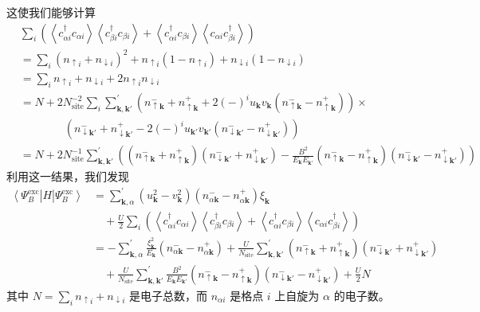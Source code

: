 这使我们能够计算
\begin{align*}
&\sum_{i}\left(\left\langle c^{\dagger}_{\alpha i}c_{\alpha i}\right\rangle \left\langle c^{\dagger}_{\beta i}c_{\beta i}\right\rangle + \left\langle c^{\dagger}_{\alpha i}c_{\beta i}\right\rangle \left\langle c_{\alpha i}c^{\dagger}_{\beta i}\right\rangle\right)\\
&=\sum_{i}\left(n_{\uparrow i}+n_{\downarrow i}\right)^{2}+n_{\uparrow i}\left(1-n_{\uparrow i}\right)+n_{\downarrow i}\left(1-n_{\downarrow i}\right)\\
&=\sum_{i}n_{\uparrow i}+n_{\downarrow i}+2n_{\uparrow i}n_{\downarrow i}\\
&=N+2N^{-2}_{\mathrm{site}}\sum_{i}\sum^{\prime}_{\pmb{k},\pmb{k}'}\left(n^{-}_{\uparrow\pmb{k}}+n^{+}_{\uparrow\pmb{k}}+2(-)^{i}u_{\pmb{k}}v_{\pmb{k}}\left(n^{-}_{\uparrow\pmb{k}}-n^{+}_{\uparrow\pmb{k}}\right)\right)\times\\
&\qquad\qquad \left(n^{-}_{\downarrow\pmb{k}'}+n^{+}_{\downarrow\pmb{k}'}-2(-)^{i}u_{\pmb{k}'}v_{\pmb{k}'}\left(n^{-}_{\downarrow\pmb{k}'}-n^{+}_{\downarrow\pmb{k}'}\right)\right)\\
&=N+2N^{-1}_{\mathrm{site}}\sum^{\prime}_{\pmb{k},\pmb{k}'}\left(\left(n^{-}_{\uparrow\pmb{k}}+n^{+}_{\uparrow\pmb{k}}\right)\left(n^{-}_{\downarrow\pmb{k}'}+n^{+}_{\downarrow\pmb{k}'}\right)-\frac{B^{2}}{E_{\pmb{k}}E_{\pmb{k}'}}\left(n^{-}_{\uparrow\pmb{k}}-n^{+}_{\uparrow\pmb{k}}\right)\left(n^{-}_{\downarrow\pmb{k}'}-n^{+}_{\downarrow\pmb{k}'}\right)\right)
\end{align*}
利用这一结果，我们发现
\begin{align*}
\left\langle \Psi^{\mathrm{exc}}_{B}\right|H\left|\Psi^{\mathrm{exc}}_{B}\right\rangle&=\sum^{\prime}_{\pmb{k},\alpha}\left(u^{2}_{\pmb{k}}-v^{2}_{\pmb{k}}\right)\left(n^{-}_{\alpha\pmb{k}}-n^{+}_{\alpha\pmb{k}}\right)\xi_{\pmb{k}} \tag{5.5.6}\\
&\quad+\frac{U}{2}\sum_{i}\left(\left\langle c^{\dagger}_{\alpha i}c_{\alpha i}\right\rangle \left\langle c^{\dagger}_{\beta i}c_{\beta i}\right\rangle + \left\langle c^{\dagger}_{\alpha i}c_{\beta i}\right\rangle \left\langle c_{\alpha i}c^{\dagger}_{\beta i}\right\rangle\right)\\
&=-\sum^{\prime}_{\pmb{k},\alpha}\frac{\xi^{2}_{\pmb{k}}}{E_{\pmb{k}}}\left(n^{-}_{\alpha\pmb{k}}-n^{+}_{\alpha\pmb{k}}\right)+\frac{U}{N_{\mathrm{site}}}\sum^{\prime}_{\pmb{k},\pmb{k}'}\left(n^{-}_{\uparrow\pmb{k}}+n^{+}_{\uparrow\pmb{k}}\right)\left(n^{-}_{\downarrow\pmb{k}'}+n^{+}_{\downarrow\pmb{k}'}\right)\\
&\quad+\frac{U}{N_{\mathrm{site}}}\sum^{\prime}_{\pmb{k},\pmb{k}'}\frac{B^{2}}{E_{\pmb{k}}E_{\pmb{k}'}}\left(n^{-}_{\uparrow\pmb{k}}-n^{+}_{\uparrow\pmb{k}}\right)\left(n^{-}_{\downarrow\pmb{k}'}-n^{+}_{\downarrow\pmb{k}'}\right)+\frac{U}{2}N
\end{align*}
其中 $N=\sum_{i}n_{\uparrow i}+n_{\downarrow i}$ 是电子总数，而 $n_{\alpha i}$ 是格点 $i$ 上自旋为 $\alpha$ 的电子数。

